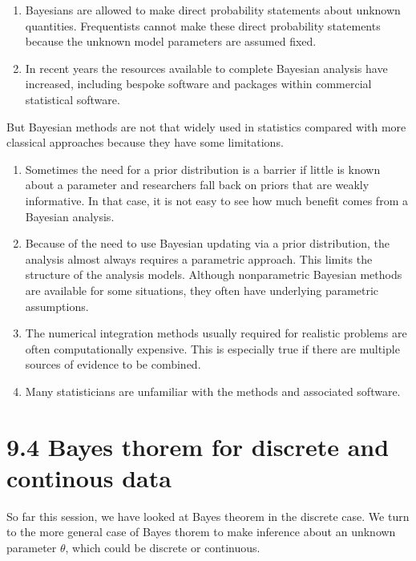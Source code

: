 \documentclass[letterpaper,10pt,english]{jupyterBook}
\begin{document}
\begin{enumerate}
\item {} 
\sphinxAtStartPar
Bayesians are allowed to make direct probability statements about unknown quantities. Frequentists cannot make these direct probability statements because the unknown model parameters are assumed fixed.

\item {} 
\sphinxAtStartPar
In recent years the resources available to complete Bayesian analysis have increased, including bespoke software and packages within commercial statistical software.

\end{enumerate}

\sphinxAtStartPar
But Bayesian methods are not that widely used in statistics compared with more classical approaches because they have some limitations.
\begin{enumerate}
%
\item {} 
\sphinxAtStartPar
Sometimes the need for a prior distribution is a barrier if little is known about a parameter and researchers fall back on priors that are weakly informative. In that case, it is not easy to see how much benefit comes from a Bayesian analysis.

\item {} 
\sphinxAtStartPar
Because of the need to use Bayesian updating via a prior distribution, the analysis almost always requires a parametric approach. This limits the structure of the analysis models. Although non\sphinxhyphen{}parametric Bayesian methods are available for some situations, they often have underlying parametric assumptions.

\item {} 
\sphinxAtStartPar
The numerical integration methods usually required for realistic problems are often computationally expensive. This is especially true if there are multiple sources of evidence to be combined.

\item {} 
\sphinxAtStartPar
Many statisticians are unfamiliar with the methods and associated software.

\end{enumerate}


\section{9.4 Bayes thorem for discrete and continous data}
\label{\detokenize{09.e. Bayesian Statistics I:bayes-thorem-for-discrete-and-continous-data}}\label{\detokenize{09.e. Bayesian Statistics I::doc}}
\sphinxAtStartPar
So far this session, we have looked at Bayes theorem in the discrete case. We turn to the more general case of Bayes thorem to make inference about an unknown parameter \(\theta\), which could be discrete or continuous.
\end{document}
